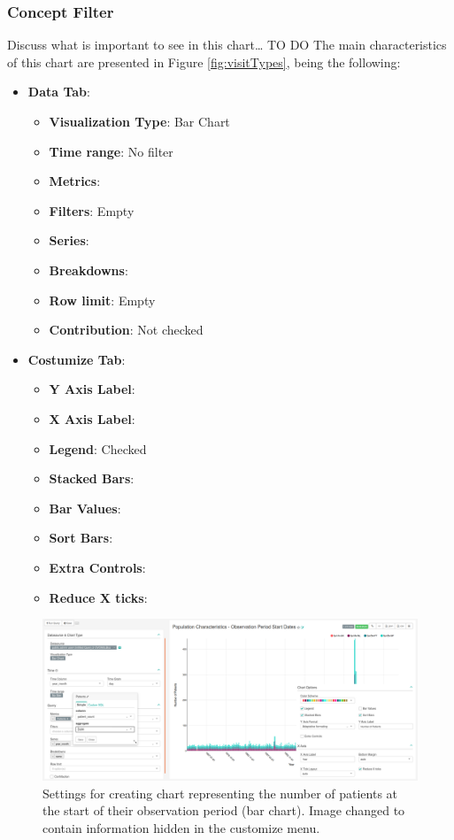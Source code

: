 \documentclass[]{book}
\providecommand{\tightlist}{%
  \setlength{\itemsep}{0pt}\setlength{\parskip}{0pt}}
\begin{document}
\subsubsection{Concept Filter}\label{concept-filter}

Discuss what is important to see in this chart\ldots{} TO DO The main
characteristics of this chart are presented in Figure
\ref{fig:visitTypes}, being the following:

\begin{itemize}
\tightlist
\item
  \textbf{Data Tab}:

  \begin{itemize}
  \tightlist
  \item
    \textbf{Visualization Type}: Bar Chart
  \item
    \textbf{Time range}: No filter
  \item
    \textbf{Metrics}:
  \item
    \textbf{Filters}: Empty
  \item
    \textbf{Series}:
  \item
    \textbf{Breakdowns}:
  \item
    \textbf{Row limit}: Empty
  \item
    \textbf{Contribution}: Not checked
  \end{itemize}
\item
  \textbf{Costumize Tab}:

  \begin{itemize}
  \tightlist
  \item
    \textbf{Y Axis Label}:
  \item
    \textbf{X Axis Label}:
  \item
    \textbf{Legend}: Checked
  \item
    \textbf{Stacked Bars}:
  \item
    \textbf{Bar Values}:
  \item
    \textbf{Sort Bars}:
  \item
    \textbf{Extra Controls}:
  \item
    \textbf{Reduce X ticks}:
  \end{itemize}
\end{itemize}

\begin{figure}
\includegraphics[width=1\linewidth]{images/populationCharacteristicsObservationPeriodStartDates} \caption{Settings for creating chart representing the number of patients at the start of their observation period (bar chart). Image changed to contain information hidden in the customize menu.}\label{fig:visitTypes7}
\end{figure}
\end{document}
